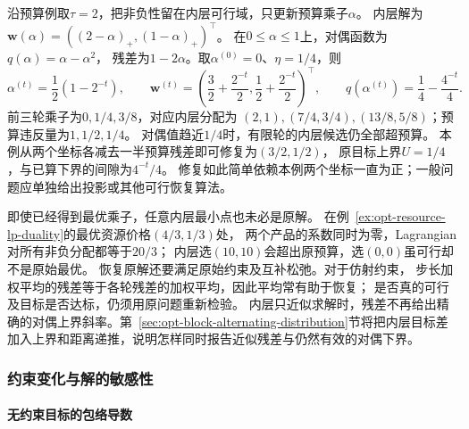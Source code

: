 沿预算例取$\tau=2$，把非负性留在内层可行域，只更新预算乘子$\alpha$。
内层解为
$\bm w(\alpha)=((2-\alpha)_+,(1-\alpha)_+)^\top$。
在$0\leq\alpha\leq1$上，对偶函数为$q(\alpha)=\alpha-\alpha^2$，
残差为$1-2\alpha$。取$\alpha^{(0)}=0$、$\eta=1/4$，则
\[
 \alpha^{(t)}=\frac12(1-2^{-t}),\qquad
 \bm w^{(t)}=\left(\frac32+\frac{2^{-t}}2,\frac12+\frac{2^{-t}}2\right)^\top,
 \qquad q(\alpha^{(t)})=\frac14-\frac{4^{-t}}4.
\]
前三轮乘子为$0,1/4,3/8$，对应内层分配为
$(2,1),(7/4,3/4),(13/8,5/8)$；预算违反量为$1,1/2,1/4$。
对偶值趋近$1/4$时，有限轮的内层候选仍全部超预算。
本例从两个坐标各减去一半预算残差即可修复为$(3/2,1/2)$，
原目标上界$U=1/4$，与已算下界的间隙为$4^{-t}/4$。
修复如此简单依赖本例两个坐标一直为正；一般问题应单独给出投影或其他可行恢复算法。

即使已经得到最优乘子，任意内层最小点也未必是原解。
在例~\ref{ex:opt-resource-lp-duality}的最优资源价格$(4/3,1/3)$处，
两个产品的系数同时为零，Lagrangian对所有非负分配都等于$20/3$；
内层选$(10,10)$会超出原预算，选$(0,0)$虽可行却不是原始最优。
恢复原解还要满足原始约束及互补松弛。对于仿射约束，
步长加权平均的残差等于各轮残差的加权平均，因此平均常有助于恢复；
是否真的可行及目标是否达标，仍须用原问题重新检验。
内层只近似求解时，残差不再给出精确的对偶上界斜率。第~\ref{sec:opt-block-alternating-distribution}节将把内层目标差加入上界和距离递推，说明怎样同时报告近似残差与仍然有效的对偶下界。

\subsubsection{约束变化与解的敏感性}
\label{sec:opt-constraint-sensitivity}

\paragraph{无约束目标的包络导数}

